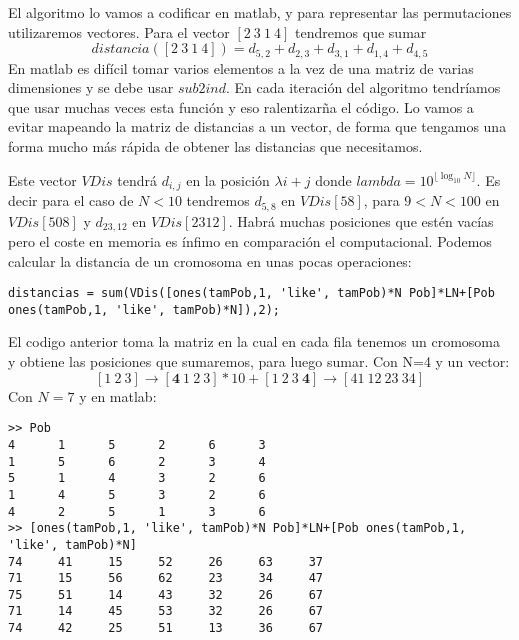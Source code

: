 \documentclass[10pt]{article}
\newcommand{\floor}[1]{\lfloor #1 \rfloor}
\begin{document}
El algoritmo lo vamos a codificar en matlab, y para representar las permutaciones utilizaremos vectores. Para el vector $[2\ 3\ 1\ 4]$ tendremos que sumar  $$distancia([2\ 3\ 1\ 4])=d_{5,2}+d_{2,3}+d_{3,1}+d_{1,4}+d_{4,5}$$
En matlab es difícil tomar varios elementos a la vez de una matriz de varias dimensiones y se debe usar $sub2ind$. En cada iteración del algoritmo tendríamos que usar muchas veces esta función y eso ralentizarña el código. Lo vamos a evitar mapeando la matriz de distancias a un vector, de forma que tengamos una forma mucho más rápida de obtener las distancias que necesitamos.\par
Este vector $VDis$ tendrá $d_{i,j}$ en la posición $\lambda i+j$ donde $lambda = 10^{\floor{\log_{10}N}}$. Es decir para el caso de $N < 10$ tendremos $d_{5,8}$ en $VDis[58]$, para $9 < N < 100$ en $VDis[508]$ y $d_{23,12}$ en $VDis[2312]$. Habrá muchas posiciones que estén vacías pero el coste en memoria es ínfimo en comparación el computacional. Podemos calcular la distancia de un cromosoma en unas pocas operaciones:
\begin{verbatim}
distancias = sum(VDis([ones(tamPob,1, 'like', tamPob)*N Pob]*LN+[Pob ones(tamPob,1, 'like', tamPob)*N]),2);
\end{verbatim}
El codigo anterior toma la matriz en la cual en cada fila tenemos un cromosoma y obtiene las posiciones que sumaremos, para luego sumar. Con N=4 y un vector:
$$[1\ 2\ 3] \rightarrow [\textbf{4}\ 1\ 2\ 3]*10 + [1\ 2\ 3\ \textbf{4}] \rightarrow [41\ 12\ 23\ 34]$$
Con $N=7$ y en matlab:
\begin{Verbatim}
>> Pob
4      1      5      2      6      3
1      5      6      2      3      4
5      1      4      3      2      6
1      4      5      3      2      6
4      2      5      1      3      6
>> [ones(tamPob,1, 'like', tamPob)*N Pob]*LN+[Pob ones(tamPob,1, 'like', tamPob)*N]
74     41     15     52     26     63     37
71     15     56     62     23     34     47
75     51     14     43     32     26     67
71     14     45     53     32     26     67
74     42     25     51     13     36     67

\end{Verbatim}
\pagebreak
\end{document}
